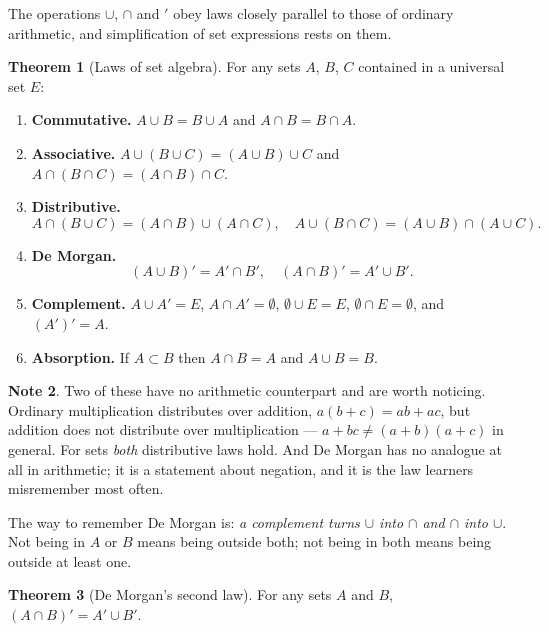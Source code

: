 \documentclass[11pt,a4paper]{article}
\theoremstyle{definition}
\newtheorem{thm}{Theorem}[section]
\newtheorem{note}[thm]{Note}
\begin{document}
The operations $\cup$, $\cap$ and $'$ obey laws closely parallel to those of
ordinary arithmetic, and simplification of set expressions rests on them.

\begin{thm}[Laws of set algebra]
For any sets $A$, $B$, $C$ contained in a universal set $E$:
\begin{enumerate}
\item[(i).] \textbf{Commutative.} $A\cup B=B\cup A$ and $A\cap B=B\cap A$.
\item[(ii).] \textbf{Associative.} $A\cup(B\cup C)=(A\cup B)\cup C$ and
$A\cap(B\cap C)=(A\cap B)\cap C$.
\item[(iii).] \textbf{Distributive.}
$$A\cap(B\cup C)=(A\cap B)\cup(A\cap C),\quad 
A\cup(B\cap C)=(A\cup B)\cap(A\cup C).$$
\item[(iv).] \textbf{De Morgan.}
$$(A\cup B)'=A'\cap B',\quad (A\cap B)'=A'\cup B'.$$
\item[(v).] \textbf{Complement.} $A\cup A'=E$, $A\cap A'=\emptyset$,
$\emptyset\cup E=E$, $\emptyset\cap E=\emptyset$, and $(A')'=A$.
\item[(vi).] \textbf{Absorption.} If $A\subset B$ then $A\cap B=A$ and
$A\cup B=B$.
\end{enumerate}
\end{thm}

\begin{note}
Two of these have no arithmetic counterpart and are worth noticing. Ordinary
multiplication distributes over addition, $a(b+c)=ab+ac$, but addition does not
distribute over multiplication --- $a+bc\neq(a+b)(a+c)$ in general. For sets
\emph{both} distributive laws hold. And De Morgan has no analogue at all in
arithmetic; it is a statement about negation, and it is the law learners
misremember most often.

The way to remember De Morgan is: \emph{a complement turns $\cup$ into $\cap$ and
$\cap$ into $\cup$}. Not being in $A$ or $B$ means being outside both; not being
in both means being outside at least one.
\end{note}

\begin{thm}[De Morgan's second law]
For any sets $A$ and $B$, \ $(A\cap B)'=A'\cup B'$.
\end{thm}
\end{document}
